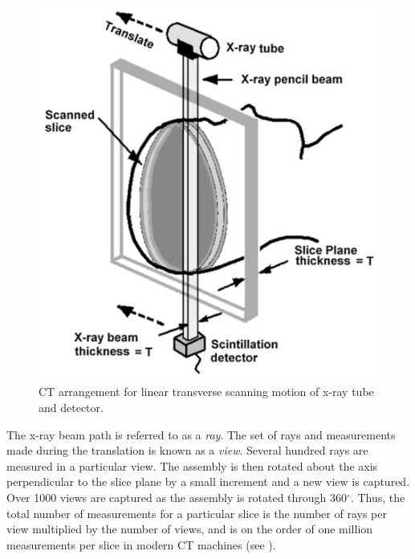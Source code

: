 \begin{figure}[ht]
\centering
		\includegraphics[scale=0.3]{media/0-imaging/ct1.png}
%
\caption{CT arrangement for linear transverse scanning motion of x-ray tube and detector. ~\cite{goldman_2007}}
\label{fig:ct1}
\end{figure}

The x-ray beam path is referred to as a \textit{ray}. The set of rays and measurements made during the translation is known as a \textit{view}. Several hundred rays are measured in a particular view. The assembly is then rotated about the axis perpendicular to the slice plane by a small increment and a new view is captured. Over 1000 views are captured as the assembly is rotated through 360$^{\circ}$. Thus, the total number of measurements for a particular slice is the number of rays per view multiplied by the number of views, and is on the order of one million measurements per slice in modern CT machines (see ).

